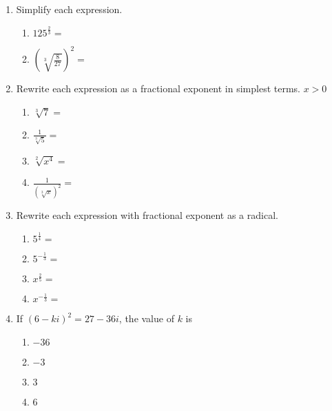 \documentclass[12pt, twoside]{article}
\begin{document}
\begin{enumerate}[itemsep=0.5cm]
\item Simplify each expression.
    \begin{multicols}{2}
    \begin{enumerate}[itemsep=0.5cm]
        \item $\displaystyle 125^{\frac{2}{3}} =$
        \item $\left( \sqrt[3]{\frac{8}{27}} \right)^{2} =$
    \end{enumerate}
    \end{multicols} \vspace{2cm}

    
\item Rewrite each expression as a fractional exponent in simplest terms. $x>0$
    \begin{multicols}{2}
      \begin{enumerate}[itemsep=1cm]
          \item $\sqrt[3]{7} =$
          \item $\displaystyle \frac{1}{\sqrt[3]{5}}=$
          \item $\sqrt[2]{x^4} =$
          \item $\displaystyle \frac{1}{(\sqrt[3]{x})^2}=$
      \end{enumerate}
      \end{multicols} \vspace{1cm}
  
\item Rewrite each expression with fractional exponent as a radical.
    \begin{multicols}{2}
      \begin{enumerate}[itemsep=1cm]
        \item $\displaystyle 5^{\frac{1}{4}}=$
        \item $\displaystyle 5^{-\frac{1}{3}}=$
        \item $\displaystyle x^{\frac{2}{5}}=$
        \item $\displaystyle x^{-\frac{1}{3}}=$
      \end{enumerate}
      \end{multicols}
        
\newpage
\item If \((6 - ki)^2 = 27 - 36i\), the value of \(k\) is
\begin{enumerate}
    \item \(-36\)
    \item \(-3\)
    \item \(3\)
    \item \(6\)
\end{enumerate}


\end{enumerate}
\end{document}
